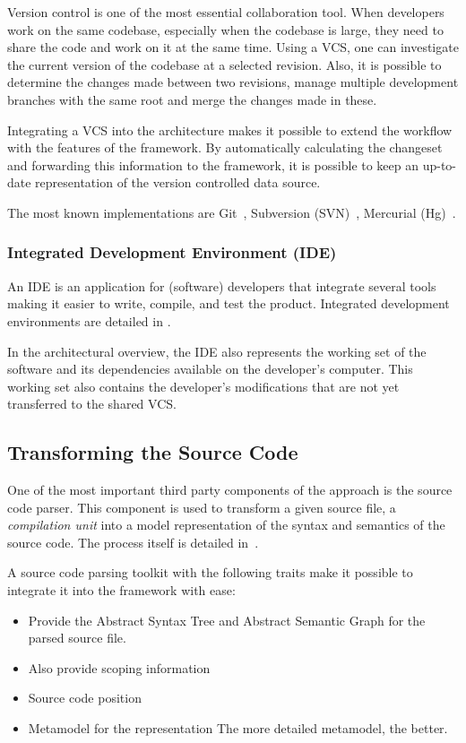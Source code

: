 Version control is one of the most essential collaboration tool. When developers work on the same codebase, especially when the codebase is large, they need to share the code and work on it at the same time. Using a VCS, one can investigate the current version of the codebase at a selected revision. Also, it is possible to determine the changes made between two revisions, manage multiple development branches with the same root and merge the changes made in these.

Integrating a VCS into the architecture makes it possible to extend the workflow with the features of the framework. By automatically calculating the changeset and forwarding this information to the framework, it is possible to keep an up-to-date representation of the version controlled data source.

The most known implementations are Git~\cite{git}, Subversion (SVN)~\cite{svn}, Mercurial (Hg)~\cite{hg}.

\subsubsection{Integrated Development Environment (IDE)}
An IDE is an application for (software) developers that integrate several tools making it easier to write, compile, and test the product. Integrated development environments are detailed in .

In the architectural overview, the IDE also represents the working set of the software and its dependencies available on the developer's computer. This working set also contains the developer's modifications that are not yet transferred to the shared VCS.


\subsection{Transforming the Source Code}
One of the most important third party components of the approach is the source code parser. This component is used to transform a given source file, a \emph{compilation unit} into a model representation of the syntax and semantics of the source code. The process itself is detailed in~.

A source code parsing toolkit with the following traits make it possible to integrate it into the framework with ease:

\begin{itemize}[topsep=0pt]
  \item Provide the Abstract Syntax Tree and Abstract Semantic Graph for the parsed source file.

  \item Also provide scoping information

  \item Source code position

  \item Metamodel for the representation
  The more detailed metamodel, the better.
\end{itemize}

